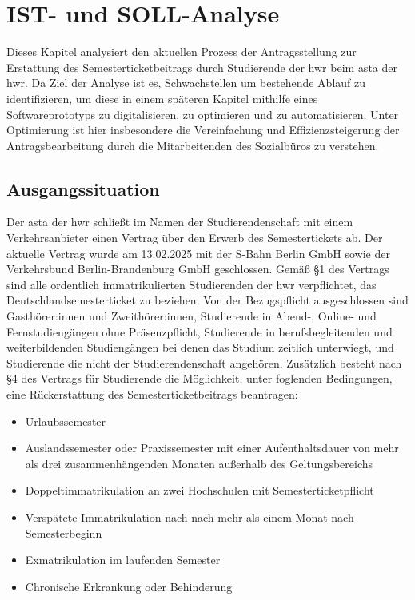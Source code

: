 
\chapter{IST- und SOLL-Analyse}\label{cha:ist}
Dieses Kapitel analysiert den aktuellen Prozess der Antragsstellung zur Erstattung des Semesterticketbeitrags durch Studierende der \gls{hwr} beim \gls{asta} der \gls{hwr}. Da Ziel der Analyse ist es, Schwachstellen um bestehende Ablauf zu identifizieren, um diese in einem späteren Kapitel mithilfe eines Softwareprototyps zu digitalisieren, zu optimieren und zu automatisieren. Unter Optimierung ist hier insbesondere die Vereinfachung und Effizienzsteigerung der Antragsbearbeitung durch die Mitarbeitenden des Sozialbüros zu verstehen. 

\section{Ausgangssituation}\label{sec:Ausgangssituation}
Der \gls{asta} der \gls{hwr} schließt im Namen der Studierendenschaft mit einem Verkehrsanbieter einen Vertrag über den Erwerb des Semestertickets ab. Der aktuelle Vertrag wurde am 13.02.2025 mit der S-Bahn Berlin GmbH sowie der Verkehrsbund Berlin-Brandenburg GmbH geschlossen. Gemäß §1 des Vertrags sind alle ordentlich immatrikulierten Studierenden der \gls{hwr} verpflichtet, das Deutschlandsemesterticket zu beziehen. Von der Bezugspflicht ausgeschlossen sind Gasthörer:innen und Zweithörer:innen, Studierende in Abend-, Online- und Fernstudiengängen ohne Präsenzpflicht, Studierende in berufsbegleitenden und weiterbildenden Studiengängen bei denen das Studium zeitlich unterwiegt, und Studierende die nicht der Studierendenschaft angehören. 
Zusätzlich besteht nach §4 des Vertrags für Studierende die Möglichkeit, unter foglenden Bedingungen, eine Rückerstattung des Semesterticketbeitrags beantragen: 
\begin{itemize}
  \item Urlaubssemester
  \item Auslandssemester oder Praxissemester mit einer Aufenthaltsdauer von mehr als drei zusammenhängenden Monaten außerhalb des Geltungsbereichs
  \item Doppeltimmatrikulation an zwei Hochschulen mit Semesterticketpflicht
  \item Verspätete Immatrikulation nach nach mehr als einem Monat nach Semesterbeginn
  \item Exmatrikulation im laufenden Semester
  \item Chronische Erkrankung oder Behinderung
\end{itemize}

